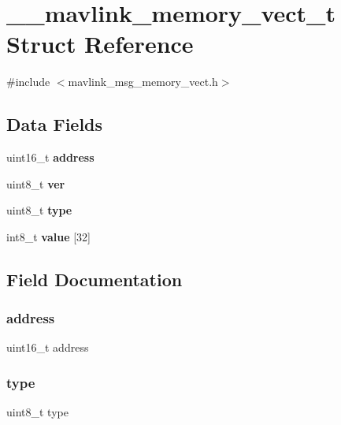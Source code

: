 \section{\+\_\+\+\_\+mavlink\+\_\+memory\+\_\+vect\+\_\+t Struct Reference}
\label{struct____mavlink__memory__vect__t}


{\ttfamily \#include $<$mavlink\+\_\+msg\+\_\+memory\+\_\+vect.\+h$>$}

\subsection*{Data Fields}
\begin{DoxyCompactItemize}
\item 
uint16\+\_\+t \textbf{ address}
\item 
uint8\+\_\+t \textbf{ ver}
\item 
uint8\+\_\+t \textbf{ type}
\item 
int8\+\_\+t \textbf{ value} [32]
\end{DoxyCompactItemize}


\subsection{Field Documentation}
\mbox{\label{struct____mavlink__memory__vect__t_a643d30df67a67c5915fde941c934f9f8}} 
\subsubsection{address}
{\footnotesize\ttfamily uint16\+\_\+t address}

\mbox{\label{struct____mavlink__memory__vect__t_a1d127017fb298b889f4ba24752d08b8e}} 
\subsubsection{type}
{\footnotesize\ttfamily uint8\+\_\+t type}

